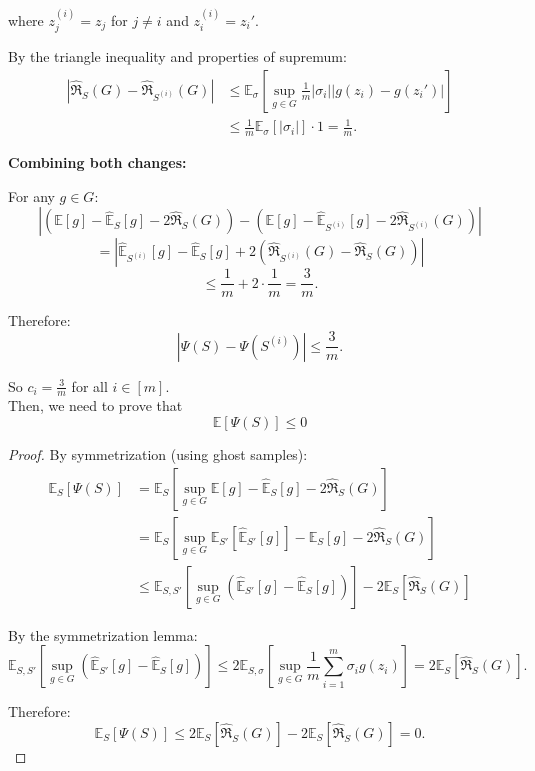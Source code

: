 \documentclass[letterpaper, 11pt]{article}
\newcommand{\1}{\mathds{1}}	%
\theoremstyle{definition}
\begin{document}
where $z_j^{(i)} = z_j$ for $j \neq i$ and $z_i^{(i)} = z_i'$.

By the triangle inequality and properties of supremum:
\begin{align*}
\left|\widehat{\mathfrak{R}}_S(G) - \widehat{\mathfrak{R}}_{S^{(i)}}(G)\right| 
&\leq \mathbb{E}_{\sigma}\left[\sup_{g \in G} \frac{1}{m}|\sigma_i||g(z_i) - g(z_i')|\right] \\
&\leq \frac{1}{m}\mathbb{E}_{\sigma}[|\sigma_i|] \cdot 1 = \frac{1}{m}.
\end{align*}

\textbf{Combining both changes:}

For any $g \in G$:
$$\left|\left(\mathbb{E}[g] - \widehat{\mathbb{E}}_S[g] - 2\widehat{\mathfrak{R}}_S(G)\right) - \left(\mathbb{E}[g] - \widehat{\mathbb{E}}_{S^{(i)}}[g] - 2\widehat{\mathfrak{R}}_{S^{(i)}}(G)\right)\right|$$
$$= \left|\widehat{\mathbb{E}}_{S^{(i)}}[g] - \widehat{\mathbb{E}}_S[g] + 2(\widehat{\mathfrak{R}}_{S^{(i)}}(G) - \widehat{\mathfrak{R}}_S(G))\right|$$
$$\leq \frac{1}{m} + 2 \cdot \frac{1}{m} = \frac{3}{m}.$$

Therefore:
$$|\Psi(S) - \Psi(S^{(i)})| \leq \frac{3}{m}.$$

So $c_i = \frac{3}{m}$ for all $i \in [m]$.
\\
Then, we need to prove that
$$\mathbb{E}[\Psi(S)] \leq 0$$

\begin{proof}
By symmetrization (using ghost samples):
\begin{align*}
\mathbb{E}_S[\Psi(S)] &= \mathbb{E}_S\left[\sup_{g \in G} \mathbb{E}[g] - \widehat{\mathbb{E}}_S[g] - 2\widehat{\mathfrak{R}}_S(G)\right] \\
&= \mathbb{E}_S\left[\sup_{g \in G} \mathbb{E}_{S'}[\widehat{\mathbb{E}}_{S'}[g]] - \widehat{\mathbb{E}}_S[g] - 2\widehat{\mathfrak{R}}_S(G)\right] \\
&\leq \mathbb{E}_{S,S'}\left[\sup_{g \in G} (\widehat{\mathbb{E}}_{S'}[g] - \widehat{\mathbb{E}}_S[g])\right] - 2\mathbb{E}_S[\widehat{\mathfrak{R}}_S(G)]
\end{align*}

By the symmetrization lemma:
$$\mathbb{E}_{S,S'}\left[\sup_{g \in G} (\widehat{\mathbb{E}}_{S'}[g] - \widehat{\mathbb{E}}_S[g])\right] \leq 2\mathbb{E}_{S,\sigma}\left[\sup_{g \in G} \frac{1}{m}\sum_{i=1}^m \sigma_i g(z_i)\right] = 2\mathbb{E}_S[\widehat{\mathfrak{R}}_S(G)].$$

Therefore:
$$\mathbb{E}_S[\Psi(S)] \leq 2\mathbb{E}_S[\widehat{\mathfrak{R}}_S(G)] - 2\mathbb{E}_S[\widehat{\mathfrak{R}}_S(G)] = 0.$$
\end{proof}
\end{document}
